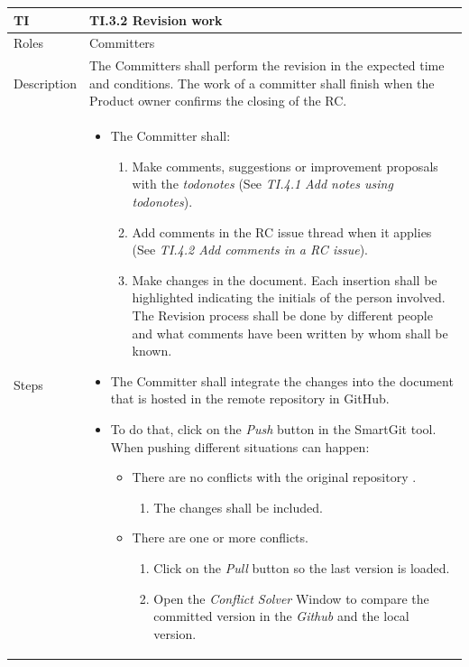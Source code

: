 \documentclass{template/openetcs_article}
\begin{document}
\begin{flushleft}
\tablefirsthead{}
\tablehead{}
\tabletail{}
\tablelasttail{}
\begin{supertabular}{|m{2cm}|m{13cm}|}
\hline
{}
TI & 
TI.3.2 Revision work
\\\hline
Roles &
Committers
\\\hline
Description &
The Committers shall perform the revision in the expected time and conditions. The work of a committer shall finish when the Product owner confirms the closing of the RC.
\\\hline
Steps &
\begin{itemize}
\item The Committer shall:
\begin{enumerate}
\item Make comments, suggestions or improvement proposals with the {\it todonotes} (See {\it TI.4.1 Add notes using todonotes}).
\item Add comments in the RC issue thread when it applies (See {\it TI.4.2 Add comments in a RC issue}).
\item Make changes in the document. Each insertion shall be highlighted indicating the initials of the person involved. The Revision process shall be done by different people and what comments have been written by whom shall be known.
\end{enumerate}
\item The Committer shall integrate the changes into the document that is hosted in the remote repository in GitHub. 
\item To do that, click on the {\it Push} button in the SmartGit tool. When pushing different situations can happen:
\begin{itemize}
\item There are no conflicts with the original repository .
\begin{enumerate}
\item The changes shall be included.
\end{enumerate}
\end{itemize}
\begin{itemize}
\item There are one or more conflicts.
\begin{enumerate}
\item Click on the {\it Pull} button so the last version is loaded. 
\item Open the {\it Conflict Solver} Window to compare the committed version in the {\it Github} and the local version. 

\end{enumerate}
\end{itemize}
\end{itemize}
\end{supertabular}
\end{flushleft}
\end{document}
